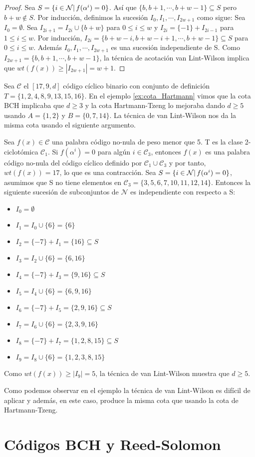\begin{proof}
Sea $S = \{ i \in \mathcal{N} | \thinspace f(\alpha^i) = 0 \}$. Así que $\{ b,b+1, \cdots , b+w-1 \} \subseteq S$ pero $b+w \not\in S$. Por inducción, definimos la sucesión $I_0,I_1, \cdots , I_{2w+1}$ como sigue: Sea $I_0 = \emptyset$. Sea $I_{2i+1} = I_{2i} \cup \{ b+w \}$ para $ 0 \leq i \leq w$ y $I_{2i} = \{ -1 \} + I_{2i-1}$ para $ 1 \leq i \leq w$. Por inducción, $I_{2i} = \{ b+w-i,b+w-i+1, \cdots , b+w-1 \} \subseteq S$ para $ 0 \leq i \leq w$. Además $I_0,I_1, \cdots , I_{2w+1}$ es una sucesión independiente de S. Como $I_{2w+1} = \{ b,b+1, \cdots , b+w-1 \}$, la técnica de acotación van Lint-Wilson implica que $wt(f(x)) \geq |I_{2w+1} | = w+1$.
\end{proof}

\begin{exampleth}
Sea $\mathcal{C}$ el $[17,9,d]$ código cíclico binario con conjunto de definición $T = \{ 1,2,4,8,9,13,15,16 \}$. En el ejemplo \ref{ex:cota_Hartmann} vimos que la cota BCH implicaba que $ d \geq 3$ y la cota Hartmann-Tzeng lo mejoraba dando $d \geq 5$ usando $A = \{ 1,2 \}$ y $B = \{ 0,7,14 \}$. La técnica de van Lint-Wilson nos da la misma cota usando el siguiente argumento. 

Sea $f(x) \in \mathcal{C}$ una palabra código no-nula de peso menor que 5. T es la clase 2-ciclotómica $\mathcal{C}_1$. Si $f(\alpha^i) = 0$ para algún $ i \in \mathcal{C}_3$, entonces $f(x)$ es una palabra código no-nula del código cíclico definido por $\mathcal{C}_1 \cup \mathcal{C}_3$ y por tanto, $wt(f(x)) = 17$, lo que es una contracción. Sea $S = \{ i \in \mathcal{N} | \thinspace f(\alpha^i) = 0 \}$, asumimos que S no tiene elementos en $\mathcal{C}_3 = \{ 3,5,6,7,10,11,12,14 \}$. Entonces la siguiente sucesión de subconjuntos de $\mathcal{N}$ es independiente con respecto a S:

\begin{itemize}
	\item $I_0 = \emptyset$
	\item $I_1 = I_0 \cup \{ 6 \} = \{ 6 \}$
	\item $I_2 = \{ -7 \} + I_1  = \{ 16 \} \subseteq S$
	\item $I_3 = I_2 \cup \{ 6 \} = \{ 6,16 \}$
	\item $I_4 = \{ -7 \} + I_3  = \{ 9, 16 \} \subseteq S$
	\item $I_5 = I_4 \cup \{ 6 \} = \{ 6,9,16 \}$
	\item $I_6 = \{ -7 \} + I_5  = \{ 2,9,16 \} \subseteq S$
	\item $I_7 = I_6 \cup \{ 6 \} = \{ 2,3,9,16 \}$
	\item $I_8 = \{ -7 \} + I_7  = \{ 1,2,8,15 \} \subseteq S$
	\item $I_9 = I_8 \cup \{ 6 \} = \{ 1,2,3,8,15 \}$
\end{itemize}

Como $wt(f(x)) \geq | I_9 | = 5$, la técnica de van Lint-Wilson muestra que $ d \geq 5$.

\end{exampleth}

Como podemos observar en el ejemplo la técnica de van Lint-Wilson es difícil de aplicar y además, en este caso, produce la misma cota que usando la cota de Hartmann-Tzeng.

\section{Códigos BCH y Reed-Solomon}




